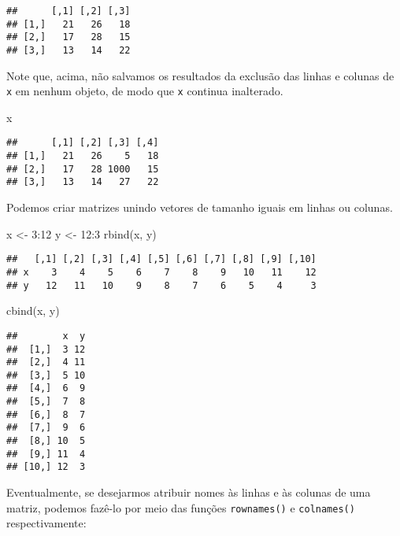 \documentclass[
]{book}
\newenvironment{Shaded}{\begin{snugshade}}{\end{snugshade}}
\newcommand{\DecValTok}[1]{\textcolor[rgb]{0.00,0.00,0.81}{#1}}
\newcommand{\FunctionTok}[1]{\textcolor[rgb]{0.00,0.00,0.00}{#1}}
\newcommand{\NormalTok}[1]{#1}
\newcommand{\OtherTok}[1]{\textcolor[rgb]{0.56,0.35,0.01}{#1}}
\newcommand{\SpecialCharTok}[1]{\textcolor[rgb]{0.00,0.00,0.00}{#1}}
\begin{document}
\begin{verbatim}
##      [,1] [,2] [,3]
## [1,]   21   26   18
## [2,]   17   28   15
## [3,]   13   14   22
\end{verbatim}

Note que, acima, não salvamos os resultados da exclusão das linhas e colunas de \texttt{x} em nenhum objeto, de modo que \texttt{x} continua inalterado.

\begin{Shaded}
\begin{Highlighting}[]
\NormalTok{x}
\end{Highlighting}
\end{Shaded}

\begin{verbatim}
##      [,1] [,2] [,3] [,4]
## [1,]   21   26    5   18
## [2,]   17   28 1000   15
## [3,]   13   14   27   22
\end{verbatim}

Podemos criar matrizes unindo vetores de tamanho iguais em linhas ou colunas.

\begin{Shaded}
\begin{Highlighting}[]
\NormalTok{x }\OtherTok{\textless{}{-}} \DecValTok{3}\SpecialCharTok{:}\DecValTok{12}
\NormalTok{y }\OtherTok{\textless{}{-}} \DecValTok{12}\SpecialCharTok{:}\DecValTok{3}
\FunctionTok{rbind}\NormalTok{(x, y)}
\end{Highlighting}
\end{Shaded}

\begin{verbatim}
##   [,1] [,2] [,3] [,4] [,5] [,6] [,7] [,8] [,9] [,10]
## x    3    4    5    6    7    8    9   10   11    12
## y   12   11   10    9    8    7    6    5    4     3
\end{verbatim}

\begin{Shaded}
\begin{Highlighting}[]
\FunctionTok{cbind}\NormalTok{(x, y)}
\end{Highlighting}
\end{Shaded}

\begin{verbatim}
##        x  y
##  [1,]  3 12
##  [2,]  4 11
##  [3,]  5 10
##  [4,]  6  9
##  [5,]  7  8
##  [6,]  8  7
##  [7,]  9  6
##  [8,] 10  5
##  [9,] 11  4
## [10,] 12  3
\end{verbatim}

Eventualmente, se desejarmos atribuir nomes às linhas e às colunas de uma matriz, podemos fazê-lo por meio das funções \texttt{rownames()} e \texttt{colnames()} respectivamente:
\end{document}
